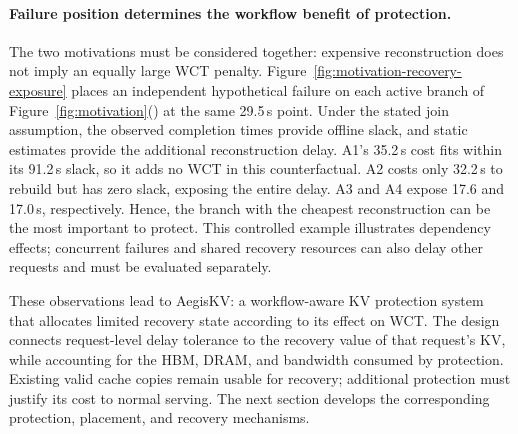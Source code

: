 \paragraph{Failure position determines the workflow benefit of protection.}
The two motivations must be considered together: expensive reconstruction
does not imply an equally large WCT penalty. Figure~\ref{fig:motivation-recovery-exposure}
places an independent hypothetical failure on each active branch of
Figure~\ref{fig:motivation}() at the same
29.5\,s point. Under the stated join assumption, the observed completion
times provide offline slack, and static estimates provide the additional
reconstruction delay. A1's 35.2\,s cost fits within its 91.2\,s slack,
so it adds no WCT in this counterfactual. A2 costs only 32.2\,s to rebuild
but has zero slack, exposing the entire delay. A3 and A4 expose 17.6 and
17.0\,s, respectively. Hence, the branch with the cheapest reconstruction
can be the most important to protect. This controlled example illustrates
dependency effects; concurrent failures and shared recovery resources can
also delay other requests and must be evaluated separately.

\label{sec:motivation-goals}
These observations lead to AegisKV: a workflow-aware KV protection system
that allocates limited recovery state according to its effect on WCT.
The design connects request-level delay tolerance to the recovery value
of that request's KV, while accounting for the HBM, DRAM, and bandwidth
consumed by protection. Existing valid cache copies remain usable for
recovery; additional protection must justify its cost to normal serving.
The next section develops the corresponding protection, placement, and
recovery mechanisms.
